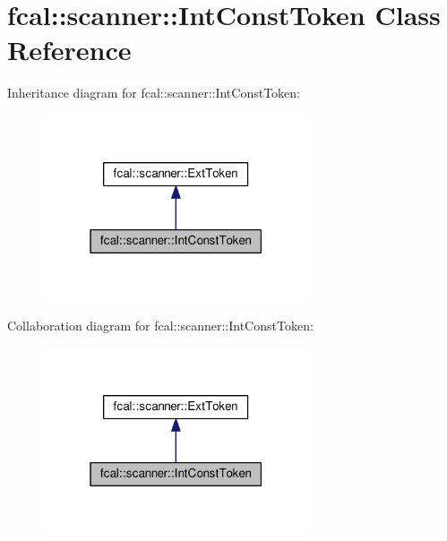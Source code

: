 \hypertarget{classfcal_1_1scanner_1_1IntConstToken}{}\section{fcal\+:\+:scanner\+:\+:Int\+Const\+Token Class Reference}
\label{classfcal_1_1scanner_1_1IntConstToken}


Inheritance diagram for fcal\+:\+:scanner\+:\+:Int\+Const\+Token\+:
\nopagebreak
\begin{figure}[H]
\begin{center}
\leavevmode
\includegraphics[width=223pt]{classfcal_1_1scanner_1_1IntConstToken__inherit__graph}
\end{center}
\end{figure}


Collaboration diagram for fcal\+:\+:scanner\+:\+:Int\+Const\+Token\+:
\nopagebreak
\begin{figure}[H]
\begin{center}
\leavevmode
\includegraphics[width=223pt]{classfcal_1_1scanner_1_1IntConstToken__coll__graph}
\end{center}
\end{figure}
